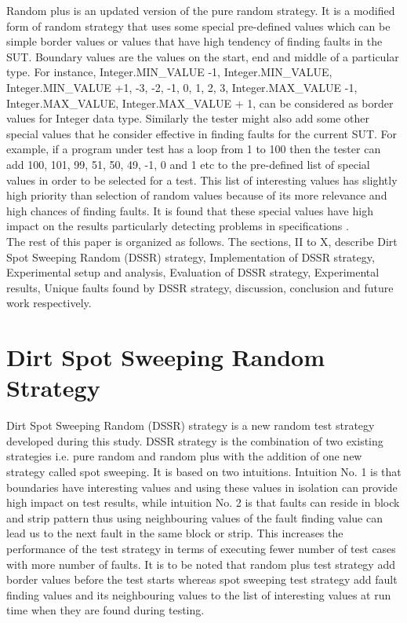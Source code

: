 \documentclass[10pt, conference, compsocconf]{IEEEtran}
\begin{document}
Random plus \cite{Leitner2007} is an updated version of the pure random strategy. It is a modified form of random strategy that uses some special pre-defined values which can be simple border values or values that have high tendency of finding faults in the SUT. Boundary values \cite{Beizer1990} are the values on the start, end and middle of a particular type. For instance,  Integer.MIN\_VALUE -1, Integer.MIN\_VALUE, Integer.MIN\_VALUE +1, -3, -2, -1, 0, 1, 2, 3, Integer.MAX\_VALUE -1, Integer.MAX\_VALUE, Integer.MAX\_VALUE + 1, can be considered as border values for Integer data type. Similarly the tester might also add some other special values that he consider effective in finding faults for the current SUT. For example, if a program under test has a loop from 1 to 100 then the tester can add 100, 101, 99, 51, 50, 49, -1, 0 and 1 etc to the pre-defined list of special values in order to be selected for a test. This list of interesting values has slightly high priority than selection of random values because of its more relevance and high chances of finding faults. It is found that these special values have high impact on the results particularly detecting problems in specifications \cite{Ciupa2008}.\\

The rest of this paper is organized as follows. The sections, II to X, describe Dirt Spot Sweeping Random (DSSR) strategy, Implementation of DSSR strategy, Experimental setup and analysis, Evaluation of DSSR strategy, Experimental results, Unique faults found by DSSR strategy, discussion, conclusion and future work respectively.\\ 

\section{Dirt Spot Sweeping Random Strategy}

Dirt Spot Sweeping Random (DSSR) strategy is a new random test strategy developed during this study. DSSR strategy is the combination of two existing strategies i.e. pure random and random plus with the addition of one new strategy called spot sweeping. It is based on two intuitions. Intuition No. 1 is that boundaries have interesting values and using these values in isolation can provide high impact on test results, while intuition No. 2 is that faults can reside in block and strip pattern thus using neighbouring values of the fault finding value can lead us to the next fault in the same block or strip. This increases the performance of the test strategy in terms of executing fewer number of test cases with more number of faults. It is to be noted that random plus test strategy add border values before the test starts whereas spot sweeping test strategy add fault finding values and its neighbouring values to the list of interesting values at run time when they are found during testing.\\
\end{document}
